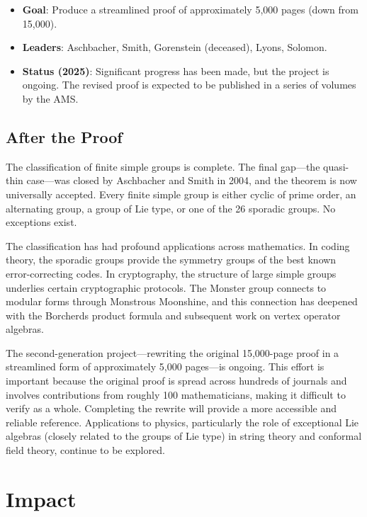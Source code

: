 \begin{itemize}
\item \textbf{Goal}: Produce a streamlined proof of approximately 5,000 pages (down from 15,000).
\item \textbf{Leaders}: Aschbacher, Smith, Gorenstein (deceased), Lyons, Solomon.
\item \textbf{Status (2025)}: Significant progress has been made, but the project is ongoing. The revised proof is expected to be published in a series of volumes by the AMS.
\end{itemize}

\subsection{After the Proof}

The classification of finite simple groups is complete. The final gap---the quasi-thin case---was closed by Aschbacher and Smith in 2004, and the theorem is now universally accepted. Every finite simple group is either cyclic of prime order, an alternating group, a group of Lie type, or one of the 26 sporadic groups. No exceptions exist.

The classification has had profound applications across mathematics. In coding theory, the sporadic groups provide the symmetry groups of the best known error-correcting codes. In cryptography, the structure of large simple groups underlies certain cryptographic protocols. The Monster group connects to modular forms through Monstrous Moonshine, and this connection has deepened with the Borcherds product formula and subsequent work on vertex operator algebras.

The second-generation project---rewriting the original 15,000-page proof in a streamlined form of approximately 5,000 pages---is ongoing. This effort is important because the original proof is spread across hundreds of journals and involves contributions from roughly 100 mathematicians, making it difficult to verify as a whole. Completing the rewrite will provide a more accessible and reliable reference. Applications to physics, particularly the role of exceptional Lie algebras (closely related to the groups of Lie type) in string theory and conformal field theory, continue to be explored.

\section{Impact}


